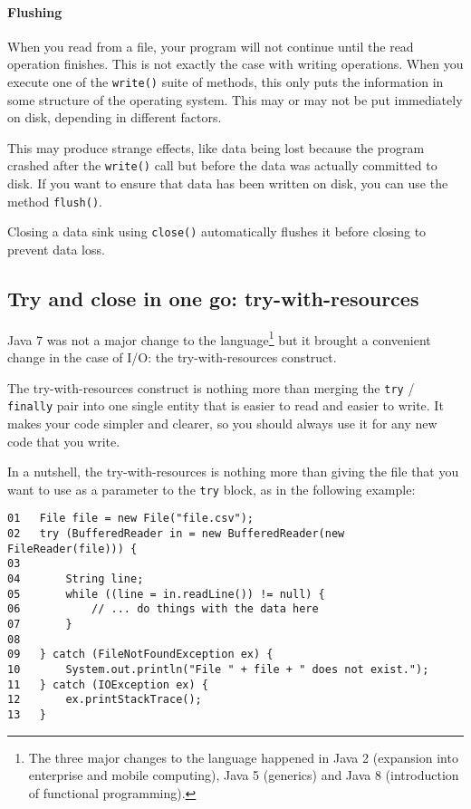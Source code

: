 

\paragraph{Flushing}
\label{sec:flushing}

When you read from a file, your program will not continue until the
read operation finishes. This is not exactly the case with writing
operations. When you execute one of the \verb+write()+ suite of methods, this only
puts the information in some structure of the operating system. This
may or may not be put immediately on disk, depending in different
factors. 

This may produce strange effects, like data being lost because the
program crashed after the \verb+write()+ call but before the data was
actually committed to disk. If you want to ensure that data has been
written on disk, you can use the method \verb+flush()+. 

Closing a data sink using \verb+close()+ 
automatically flushes it before closing to prevent data loss. 


\subsection{Try and close in one go: try-with-resources}

Java 7 was not a major change to the language\footnote{The three major
  changes to the language happened in Java 2 (expansion into
  enterprise and mobile computing), Java 5 (generics) and Java 8
  (introduction of functional programming).} but it brought a
convenient change in the case of I/O: the try-with-resources
construct.

The try-with-resources construct is nothing more than merging the
\verb+try+ / \verb+finally+ pair into one single entity that is easier
to read and easier to write. It makes your code simpler and clearer,
so you should always use it for any new code that you write.

In a nutshell, the try-with-resources is nothing more than giving the
file that you want to use as a parameter to the \verb+try+ block, as
in the following example:

\begin{verbatim}
01   File file = new File("file.csv");
02   try (BufferedReader in = new BufferedReader(new FileReader(file))) {
03     
04       String line;
05       while ((line = in.readLine()) != null) {
06           // ... do things with the data here
07       }
08     
09   } catch (FileNotFoundException ex) {
10       System.out.println("File " + file + " does not exist.");
11   } catch (IOException ex) {
12       ex.printStackTrace();
13   }
\end{verbatim}

